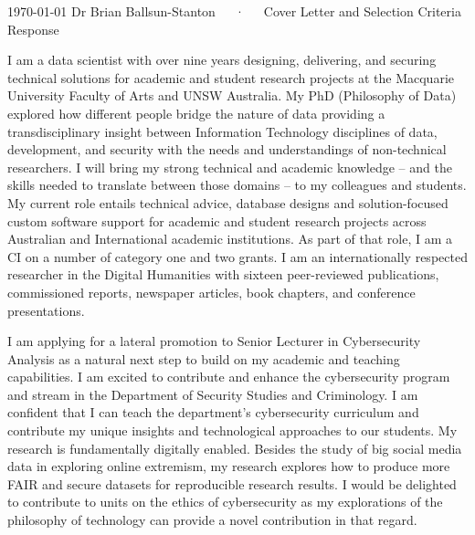 \documentclass[11pt, a4paper]{awesome-cv}
\begin{document}
\makecvheader[C]

\makecvfooter
 {\today}
 {Dr Brian Ballsun-Stanton~~~·~~~Cover Letter and Selection Criteria Response}
 {\thepage}

\makelettertitle

\begin{cvletter}


I am a data scientist with over nine years designing, delivering, and securing technical solutions for academic and student research projects at the Macquarie University Faculty of Arts and UNSW Australia. My PhD (Philosophy of Data) explored how different people bridge the nature of data providing a transdisciplinary insight between Information Technology disciplines of data, development, and security with the needs and understandings of non-technical researchers. I will bring my strong technical and academic knowledge -- and the skills needed to translate between those domains -- to my colleagues and students. My current role entails technical advice, database designs and solution-focused custom software support for academic and student research projects across Australian and International academic institutions. As part of that role, I am a CI on a number of category one and two grants. I am an internationally respected researcher in the Digital Humanities with sixteen peer-reviewed publications, commissioned reports, newspaper articles, book chapters, and conference presentations. 

I am applying for a lateral promotion to Senior Lecturer in Cybersecurity Analysis as a natural next step to build on my academic and teaching capabilities. I am excited to contribute and enhance the cybersecurity program and stream in the Department of Security Studies and Criminology. I am confident that I can teach the department's cybersecurity curriculum and contribute my unique insights and technological approaches to our students. My research is fundamentally digitally enabled. Besides the study of big social media data in exploring online extremism, my research explores how to produce more FAIR and secure datasets for reproducible research results. I would be delighted to contribute to units on the ethics of cybersecurity as my explorations of the philosophy of technology can provide a novel contribution in that regard.


\end{cvletter}
\end{document}
